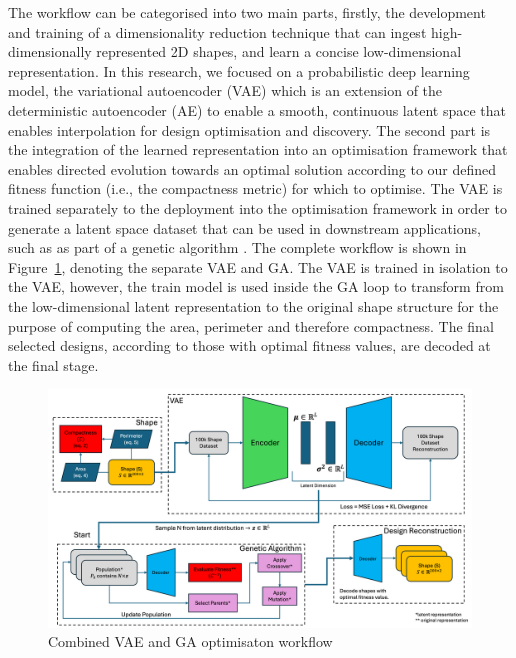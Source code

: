 \documentclass{article}
\begin{document}
The workflow can be categorised into two main parts, firstly, the development and training of a dimensionality reduction technique that can ingest high-dimensionally represented 2D shapes, and learn a concise low-dimensional representation. In this research, we focused on a probabilistic deep learning model, the variational autoencoder (VAE) which is an extension of the deterministic autoencoder (AE) to enable a smooth, continuous latent space that enables interpolation for design optimisation and discovery. The second part is the integration of the learned representation into an optimisation framework that enables directed evolution towards an optimal solution according to our defined fitness function (i.e., the compactness metric) for which to optimise. The VAE is trained separately to the deployment into the optimisation framework in order to generate a latent space dataset that can be used in downstream applications, such as as part of a genetic algorithm \citep{Deshpande2024}. The complete workflow is shown in Figure~\ref{VAE_GA_workflow}, denoting the separate VAE and GA. The VAE is trained in isolation to the VAE, however, the train model is used inside the GA loop to transform from the low-dimensional latent representation to the original shape structure for the purpose of computing the area, perimeter and therefore compactness. The final selected designs, according to those with optimal fitness values, are decoded at the final stage.


\begin{figure}[htp]
    \centering
    \includegraphics[width=12cm]{figures/workflow_diagram.png}
    \caption{Combined VAE and GA optimisaton workflow}

    \label{VAE_GA_workflow}
\end{figure}
\end{document}
